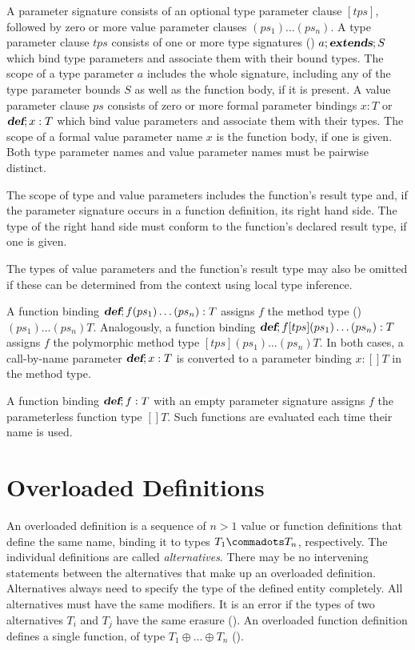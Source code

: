 \documentclass[11pt]{report}
\newcommand{\iffinaltype}[1]{}
\renewcommand{\todo}[1]{}
\begin{document}
A parameter signature consists of an optional type parameter clause
$[tps]$, followed by zero or more value parameter clauses $(ps_1)
\ldots (ps_n)$. A type parameter clause $tps$ consists of one or more
type signatures () $a ;\mbox{\sl\bfseries extends}; S$ \iffinaltype{or $\FINAL;a
\extends S$} which bind type parameters and associate them with their
bound types.  The scope of a type parameter $a$ includes the whole
signature, including any of the type parameter bounds $S$ as well as
the function body, if it is present.  A value parameter clause $ps$
consists of zero or more formal parameter bindings $x: T$ or $\mbox{\sl\bfseries def};x:
T$ which bind value parameters and associate them with their types.
The scope of a formal value parameter name $x$ is the function body,
if one is given. Both
type parameter names and value parameter names must be pairwise
distinct.

The scope of type and value parameters includes the function's result
type and, if the parameter signature occurs in a function definition,
its right hand side.  The type of the right hand side must conform to
the function's declared result type, if one is given.

The types of value parameters and the function's result type may also
be omitted if these can be determined from the context using local
type inference.

A function binding $\mbox{\sl\bfseries def};f(ps_1) \ldots (ps_n): T$ assigns $f$ the
method type () $(ps_1)\ldots(ps_n)T$.
Analogously, a function binding $\mbox{\sl\bfseries def};f[tps](ps_1) \ldots (ps_n): T$
assigns $f$ the polymorphic method type $[tps](ps_1)\ldots(ps_n)T$. In
both cases, a call-by-name parameter $\mbox{\sl\bfseries def};x:T$ is converted to a
parameter binding $x:[]T$ in the method type.

A function binding $\mbox{\sl\bfseries def};f: T$ with an empty parameter signature
assigns $f$ the parameterless function type $[]T$.  Such functions are
evaluated each time their name is used.

\section{Overloaded Definitions}
\label{sec:overloaded-defs}

An overloaded definition is a sequence of $n > 1$ value or function
definitions that define the same name, binding it to types $T_1
\commadots T_n$, respectively.  The individual definitions are called
{\em alternatives}. There may be no intervening statements between the
alternatives that make up an overloaded definition.  \todo{Issue: keep
this restriction?}  Alternatives always need to specify the type of
the defined entity completely.  All alternatives must have the same
modifiers. It is an error if the types of two alternatives $T_i$ and
$T_j$ have the same erasure ().  An overloaded
function definition defines a single function, of type $T_1 \oplus
\ldots \oplus T_n$ ().
\end{document}
